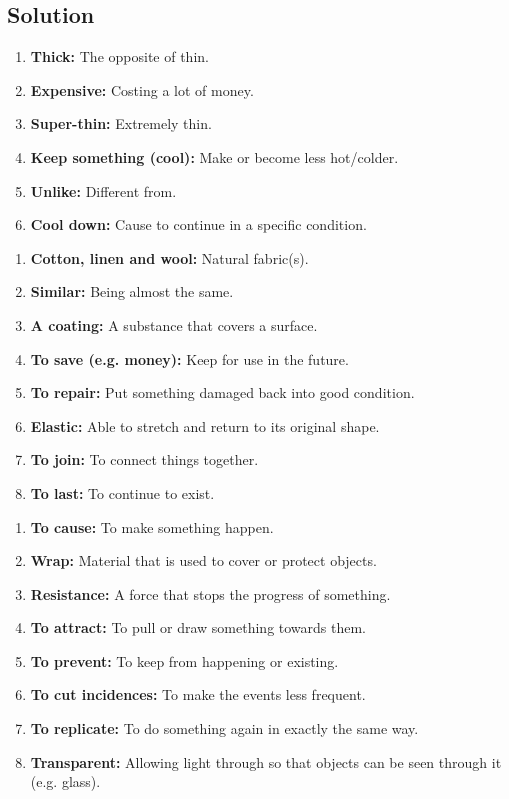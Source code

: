 \subsection*{Solution}

\begin{enumerate}
      \item \textbf{Thick:} The opposite of thin.
      \item \textbf{Expensive:} Costing a lot of money.
      \item \textbf{Super-thin:} Extremely thin.
      \item \textbf{Keep something (cool):} Make or become less hot/colder.
      \item \textbf{Unlike:} Different from.
      \item \textbf{Cool down:} Cause to continue in a specific condition.
\end{enumerate}

\begin{enumerate}
      \item \textbf{Cotton, linen and wool:} Natural fabric(s).
      \item \textbf{Similar:} Being almost the same.
      \item \textbf{A coating:} A substance that covers a surface.
      \item \textbf{To save (e.g. money):} Keep for use in the future.
      \item \textbf{To repair:} Put something damaged back into good condition.
      \item \textbf{Elastic:} Able to stretch and return to its original shape.
      \item \textbf{To join:} To connect things together.
      \item \textbf{To last:} To continue to exist.
\end{enumerate}

\begin{enumerate}
      \item \textbf{To cause:} To make something happen.
      \item \textbf{Wrap:} Material that is used to cover or protect objects.
      \item \textbf{Resistance:} A force that stops the progress of something.
      \item \textbf{To attract:} To pull or draw something towards them.
      \item \textbf{To prevent:} To keep from happening or existing.
      \item \textbf{To cut incidences:} To make the events less frequent.
      \item \textbf{To replicate:} To do something again in exactly the same way.
      \item \textbf{Transparent:} Allowing light through so that objects can be seen through it (e.g. glass).
\end{enumerate}

